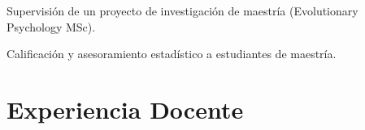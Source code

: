 \documentclass[11pt, a4paper]{awesome-cv}
\begin{document}
\begin{cventries}
{\begin{cvitems}
\item Supervisión de un proyecto de investigación de maestría (Evolutionary Psychology MSc).
\item Calificación y asesoramiento estadístico a estudiantes de maestría.
\end{cvitems}}
\end{cventries}

\hypertarget{experiencia-docente}{%
\section{Experiencia Docente}\label{experiencia-docente}}
\end{document}
